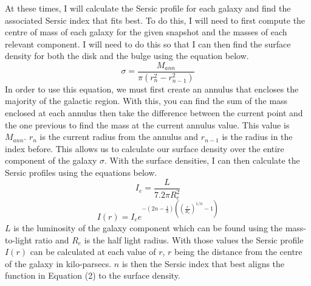 \documentclass[linenumbers,trackchanges]{aastex7}
\begin{document}
At these times, I will calculate the Sersic profile for each galaxy
and find the associated Sersic index that fits best. To do this, I
will need to first compute the centre of mass of each galaxy for the
given snapshot and the masses of each relevant component. I will need
to do this so that I can then find the surface density for both the disk and the bulge using the equation below.
\begin{equation}
\sigma=\frac{M_{ann}}{\pi(r_n^2-r_{n-1}^2)}
\end{equation}
In order to use this equation, we must first create an annulus that
encloses the majority of the galactic region. With this, you can find
the sum of the mass enclosed at each annulus then take the difference
between the current point and the one previous to find the mass at the
current annulus value. This value is \begin{math}M_{ann}\end{math}.
\begin{math}r_{n}\end{math} is the current radius from the annulus and
\begin{math}r_{n-1}\end{math} is the radius in the index before. This
allows us to calculate our surface density over the entire component of
the galaxy \begin{math}\sigma\end{math}. With the surface densities, I
can then calculate the Sersic profiles using the equations below.
\begin{equation}
I_e=\frac{L}{7.2\pi R_e^2}
\end{equation}
\begin{equation}
I(r)=I_ee^{-(2n-\frac{1}{3})((\frac{r}{R_e})^{1/n}-1)}
\end{equation}
\begin{math}L\end{math} is the luminosity of the galaxy component which
can be found using the mass-to-light ratio and
\begin{math}R_e\end{math} is the half light radius. With those values
the Sersic profile \begin{math}I(r)\end{math} can be calculated at
each value of \begin{math}r\end{math}, \begin{math}r\end{math} being
the distance from the centre of the galaxy in kilo-parsecs.
\begin{math}n\end{math} is then the Sersic index that best aligns the
function in Equation (2) to the surface density.
\end{document}
